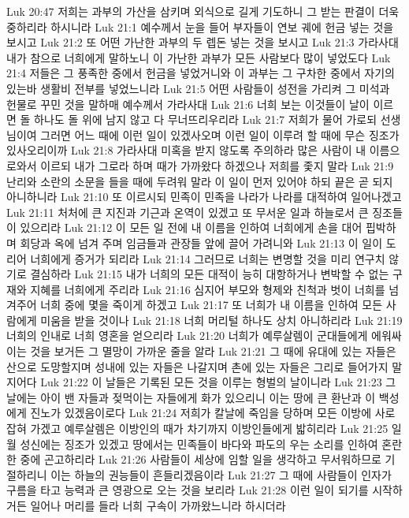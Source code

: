 Luk 20:47  저희는 과부의 가산을 삼키며 외식으로 길게 기도하니 그 받는 판결이 더욱 중하리라 하시니라
Luk 21:1  예수께서 눈을 들어 부자들이 연보 궤에 헌금 넣는 것을 보시고
Luk 21:2  또 어떤 가난한 과부의 두 렙돈 넣는 것을 보시고
Luk 21:3  가라사대 내가 참으로 너희에게 말하노니 이 가난한 과부가 모든 사람보다 많이 넣었도다
Luk 21:4  저들은 그 풍족한 중에서 헌금을 넣었거니와 이 과부는 그 구차한 중에서 자기의 있는바 생활비 전부를 넣었느니라
Luk 21:5  어떤 사람들이 성전을 가리켜 그 미석과 헌물로 꾸민 것을 말하매 예수께서 가라사대
Luk 21:6  너희 보는 이것들이 날이 이르면 돌 하나도 돌 위에 남지 않고 다 무너뜨리우리라
Luk 21:7  저희가 물어 가로되 선생님이여 그러면 어느 때에 이런 일이 있겠사오며 이런 일이 이루려 할 때에 무슨 징조가 있사오리이까
Luk 21:8  가라사대 미혹을 받지 않도록 주의하라 많은 사람이 내 이름으로와서 이르되 내가 그로라 하며 때가 가까왔다 하겠으나 저희를 좇지 말라
Luk 21:9  난리와 소란의 소문을 들을 때에 두려워 말라 이 일이 먼저 있어야 하되 끝은 곧 되지 아니하니라
Luk 21:10  또 이르시되 민족이 민족을 나라가 나라를 대적하여 일어나겠고
Luk 21:11  처처에 큰 지진과 기근과 온역이 있겠고 또 무서운 일과 하늘로서 큰 징조들이 있으리라
Luk 21:12  이 모든 일 전에 내 이름을 인하여 너희에게 손을 대어 핍박하며 회당과 옥에 넘겨 주며 임금들과 관장들 앞에 끌어 가려니와
Luk 21:13  이 일이 도리어 너희에게 증거가 되리라
Luk 21:14  그러므로 너희는 변명할 것을 미리 연구치 않기로 결심하라
Luk 21:15  내가 너희의 모든 대적이 능히 대항하거나 변박할 수 없는 구재와 지혜를 너희에게 주리라
Luk 21:16  심지어 부모와 형제와 친척과 벗이 너희를 넘겨주어 너희 중에 몇을 죽이게 하겠고
Luk 21:17  또 너희가 내 이름을 인하여 모든 사람에게 미움을 받을 것이나
Luk 21:18  너희 머리털 하나도 상치 아니하리라
Luk 21:19  너희의 인내로 너희 영혼을 얻으리라
Luk 21:20  너희가 예루살렘이 군대들에게 에워싸이는 것을 보거든 그 멸망이 가까운 줄을 알라
Luk 21:21  그 때에 유대에 있는 자들은 산으로 도망할지며 성내에 있는 자들은 나갈지며 촌에 있는 자들은 그리로 들어가지 말지어다
Luk 21:22  이 날들은 기록된 모든 것을 이루는 형벌의 날이니라
Luk 21:23  그 날에는 아이 밴 자들과 젖먹이는 자들에게 화가 있으리니 이는 땅에 큰 환난과 이 백성에게 진노가 있겠음이로다
Luk 21:24  저희가 칼날에 죽임을 당하며 모든 이방에 사로잡혀 가겠고 예루살렘은 이방인의 때가 차기까지 이방인들에게 밟히리라
Luk 21:25  일월 성신에는 징조가 있겠고 땅에서는 민족들이 바다와 파도의 우는 소리를 인하여 혼란한 중에 곤고하리라
Luk 21:26  사람들이 세상에 임할 일을 생각하고 무서워하므로 기절하리니 이는 하늘의 권능들이 흔들리겠음이라
Luk 21:27  그 때에 사람들이 인자가 구름을 타고 능력과 큰 영광으로 오는 것을 보리라
Luk 21:28  이런 일이 되기를 시작하거든 일어나 머리를 들라 너희 구속이 가까왔느니라 하시더라
